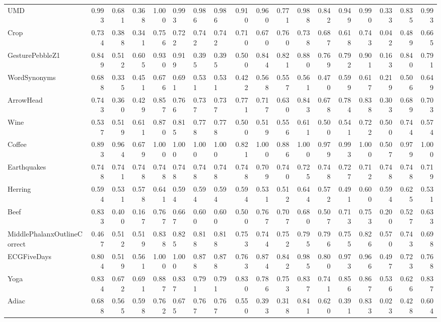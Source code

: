 \begin{tabular}{lrrrrlllrrrrrrrrrr}
UMD & 0.993 & 0.681 & 0.368 & 1.000 & 0.993 & 0.986 & 0.986 & 0.910 & 0.960 & 0.771 & 0.988 & 0.842 & 0.949 & 0.990 & 0.333 & 0.835 & 0.993 \\
Crop & 0.734 & 0.388 & 0.341 & 0.756 & 0.722 & 0.742 & 0.742 & 0.710 & 0.670 & 0.760 & 0.738 & 0.687 & 0.618 & 0.743 & 0.042 & 0.489 & 0.665 \\
GesturePebbleZ1 & 0.849 & 0.512 & 0.605 & 0.930 & 0.919 & 0.395 & 0.395 & 0.500 & 0.844 & 0.821 & 0.880 & 0.769 & 0.792 & 0.901 & 0.163 & 0.840 & 0.791 \\
WordSynonyms & 0.688 & 0.335 & 0.451 & 0.676 & 0.691 & 0.531 & 0.531 & 0.422 & 0.568 & 0.557 & 0.561 & 0.470 & 0.599 & 0.617 & 0.219 & 0.506 & 0.649 \\
ArrowHead & 0.743 & 0.360 & 0.429 & 0.857 & 0.766 & 0.737 & 0.737 & 0.771 & 0.717 & 0.630 & 0.843 & 0.678 & 0.784 & 0.838 & 0.303 & 0.689 & 0.703 \\
Wine & 0.537 & 0.519 & 0.611 & 0.870 & 0.815 & 0.778 & 0.778 & 0.500 & 0.519 & 0.556 & 0.611 & 0.500 & 0.541 & 0.722 & 0.500 & 0.744 & 0.574 \\
Coffee & 0.893 & 0.964 & 0.679 & 1.000 & 1.000 & 1.000 & 1.000 & 0.821 & 1.000 & 0.886 & 1.000 & 0.979 & 0.993 & 1.000 & 0.507 & 0.979 & 1.000 \\
Earthquakes & 0.748 & 0.741 & 0.748 & 0.748 & 0.748 & 0.748 & 0.748 & 0.748 & 0.709 & 0.740 & 0.725 & 0.748 & 0.727 & 0.712 & 0.748 & 0.748 & 0.719 \\
Herring & 0.594 & 0.531 & 0.578 & 0.641 & 0.594 & 0.594 & 0.594 & 0.594 & 0.531 & 0.512 & 0.644 & 0.572 & 0.491 & 0.600 & 0.594 & 0.625 & 0.531 \\
Beef & 0.833 & 0.400 & 0.167 & 0.767 & 0.667 & 0.600 & 0.600 & 0.500 & 0.767 & 0.707 & 0.680 & 0.507 & 0.713 & 0.753 & 0.200 & 0.527 & 0.633 \\
MiddlePhalanxOutlineCorrect & 0.467 & 0.512 & 0.519 & 0.838 & 0.825 & 0.818 & 0.818 & 0.753 & 0.744 & 0.752 & 0.795 & 0.796 & 0.755 & 0.826 & 0.570 & 0.743 & 0.698 \\
ECGFiveDays & 0.804 & 0.519 & 0.561 & 1.000 & 1.000 & 0.878 & 0.878 & 0.763 & 0.874 & 0.842 & 0.985 & 0.800 & 0.973 & 0.966 & 0.497 & 0.723 & 0.768 \\
Yoga & 0.834 & 0.672 & 0.691 & 0.887 & 0.837 & 0.791 & 0.791 & 0.830 & 0.786 & 0.753 & 0.837 & 0.741 & 0.856 & 0.867 & 0.536 & 0.626 & 0.837 \\
Adiac & 0.688 & 0.565 & 0.598 & 0.762 & 0.675 & 0.767 & 0.767 & 0.550 & 0.393 & 0.318 & 0.841 & 0.620 & 0.391 & 0.833 & 0.023 & 0.428 & 0.604 \\

\end{tabular}
